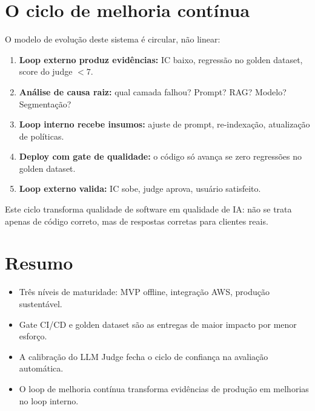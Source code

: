 \section{O ciclo de melhoria cont\'inua}

O modelo de evolu\c{c}\~ao deste sistema \'e circular, n\~ao linear:

\begin{enumerate}[leftmargin=*]
  \item \textbf{Loop externo produz evid\^encias:} IC baixo, regress\~ao
        no golden dataset, score do judge $< 7$.
  \item \textbf{An\'alise de causa raiz:} qual camada falhou? Prompt?
        RAG? Modelo? Segmenta\c{c}\~ao?
  \item \textbf{Loop interno recebe insumos:} ajuste de prompt,
        re-indexa\c{c}\~ao, atualiza\c{c}\~ao de pol\'iticas.
  \item \textbf{Deploy com gate de qualidade:} o c\'odigo s\'o avan\c{c}a
        se zero regress\~oes no golden dataset.
  \item \textbf{Loop externo valida:} IC sobe, judge aprova, usu\'ario
        satisfeito.
\end{enumerate}

Este ciclo transforma qualidade de software em qualidade de IA: n\~ao se
trata apenas de c\'odigo correto, mas de respostas corretas para clientes reais.

\section{Resumo}

\begin{itemize}[leftmargin=*]
  \item Tr\^es n\'iveis de maturidade: MVP offline, integra\c{c}\~ao AWS,
        produ\c{c}\~ao sustent\'avel.
  \item Gate CI/CD e golden dataset s\~ao as entregas de maior impacto
        por menor esfor\c{c}o.
  \item A calibra\c{c}\~ao do LLM Judge fecha o ciclo de confian\c{c}a
        na avalia\c{c}\~ao autom\'atica.
  \item O loop de melhoria cont\'inua transforma evid\^encias de produ\c{c}\~ao
        em melhorias no loop interno.
\end{itemize}

